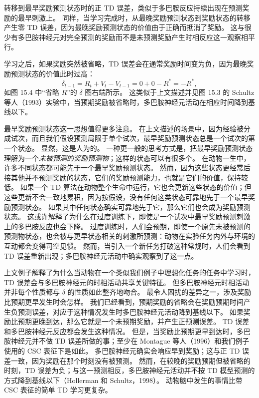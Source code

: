 \documentclass[UTF8, 12pt, fontset=fandol, oneside]{ctexart}
\begin{document}
转移到最早奖励预测状态时的正 TD 误差，类似于多巴胺反应持续出现在预测奖励的最早刺激上。
同样，当学习完成时，从最晚奖励预测状态到奖励状态的转移产生零 TD 误差，因为最晚奖励预测状态的价值由于正确而抵消了奖励。
这与很少有多巴胺神经元对完全预测的奖励而不是未预测奖励产生时相反应这一观察相平行。

学习之后，如果奖励突然被省略，TD 误差会在通常奖励时间变为负，因为最晚奖励预测状态的价值此时过高：
\[
\delta_{t-1}=R_t+V_t-V_{t-1}=0+0-R^*=-R^*,
\]
如图 15.4 中“省略 $R$”的 $\delta$ 图右端所示。
这类似于上文描述并见图 15.3 的 Schultz 等人（1993）实验中，当预期奖励被省略时，多巴胺神经元活动在相应时间降到基线以下。

最早奖励预测状态这一思想值得更多注意。
在上文描述的场景中，因为经验被分成试次，而且我们假设预测局限于单个试次，最早奖励预测状态总是一个试次的第一个状态。
显然，这是人为的。
一种更一般的思考方式是，把最早奖励预测状态理解为一个\emph{未被预测的奖励预测物}；这样的状态可以有很多个。
在动物一生中，许多不同状态都可能先于一个最早奖励预测状态。
然而，因为这些状态更经常后接其他并不预测奖励的状态，它们的奖励预测能力，也就是它们的价值，保持较低。
如果一个 TD 算法在动物整个生命中运行，它也会更新这些状态的价值；但这些更新不会一致地累积，因为按假设，没有任何这类状态可靠地先于一个最早奖励预测状态。
如果其中任何状态确实可靠地先于它，那么它们也会成为奖励预测状态。
这或许解释了为什么在过度训练下，即使是一个试次中最早奖励预测刺激上的多巴胺反应也会下降。
过度训练时，人们会预期，即使一个原先未被预测的预测物状态，也会被与更早状态相关的刺激所预测：动物在实验任务内外与环境的互动都会变得司空见惯。
然而，当引入一个新任务打破这种常规时，人们会看到 TD 误差重新出现；多巴胺神经元活动中确实观察到了这一点。

上文例子解释了为什么当动物在一个类似我们例子中理想化任务的任务中学习时，TD 误差会与多巴胺神经元的时相活动共享关键特征。
但多巴胺神经元时相活动并非每个性质都与 $\delta$ 的性质如此整齐地吻合。
最令人困扰的差异之一，涉及奖励比预期更早发生时会怎样。
我们已经看到，预期奖励的省略会在奖励预期时间产生负预测误差，对应于这种情况发生时多巴胺神经元活动降到基线以下。
如果奖励比预期更晚到达，那么它就是一个未预期奖励，并产生正预测误差。
TD 误差和多巴胺神经元反应都会发生这种情况。
但是，当奖励比预期更早到达时，多巴胺神经元并不做 TD 误差所做的事；至少在 Montague 等人（1996）和我们例子使用的 CSC 表征下是如此。
多巴胺神经元确实会响应早到奖励；这与正 TD 误差一致，因为奖励在那个时刻没有被预测。
然而，在较晚的奖励预期但被省略的时刻，TD 误差为负；与这一预测相反，多巴胺神经元活动并不按 TD 模型预测的方式降到基线以下（Hollerman 和 Schultz，1998）。
动物脑中发生的事情比带 CSC 表征的简单 TD 学习更复杂。
\end{document}
